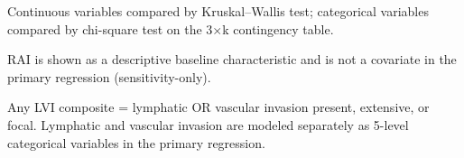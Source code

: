 \begin{landscape}
\begin{table}[htbp]
\begin{threeparttable}
\begin{tabular}{@{}lccccc@{}}
\end{tabular}
\begin{tablenotes}
\scriptsize
\item Continuous variables compared by Kruskal--Wallis test; categorical variables compared by chi-square test on the 3$\times$k contingency table.
\item[\textsuperscript{a}] RAI is shown as a descriptive baseline characteristic and is not a covariate in the primary regression (sensitivity-only).
\item[\textsuperscript{b}] Any LVI composite = lymphatic OR vascular invasion present, extensive, or focal. Lymphatic and vascular invasion are modeled separately as 5-level categorical variables in the primary regression.
\end{tablenotes}
\end{threeparttable}
\end{table}
\end{landscape}


